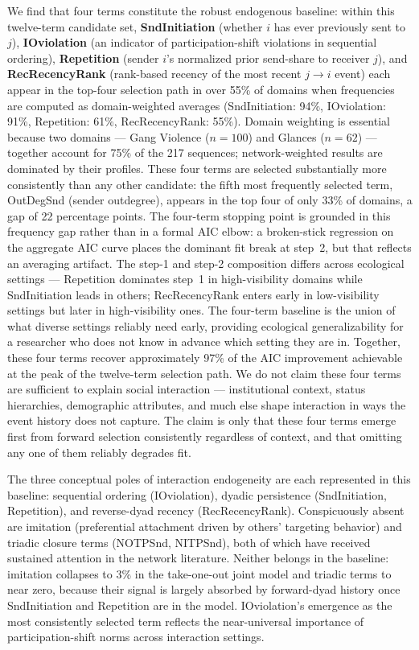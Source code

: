 \documentclass[11pt]{article}
\begin{document}
We find that four terms constitute the robust endogenous baseline: within
this twelve-term candidate set,
\textbf{SndInitiation} (whether $i$ has ever
previously sent to $j$), \textbf{IOviolation} (an indicator of participation-shift violations
in sequential ordering), \textbf{Repetition} (sender $i$'s
normalized prior send-share to receiver $j$), and \textbf{RecRecencyRank} (rank-based recency of
the most recent $j \to i$ event) each appear in the top-four
selection path in over 55\% of domains when frequencies are computed as
domain-weighted averages (SndInitiation: 94\%, IOviolation: 91\%,
Repetition: 61\%, RecRecencyRank: 55\%). Domain weighting is essential
because two domains --- Gang Violence ($n=100$) and Glances ($n=62$) ---
together account for 75\% of the 217 sequences; network-weighted results
are dominated by their profiles. These four terms are selected substantially
more consistently than any other candidate: the fifth most frequently selected
term, OutDegSnd (sender outdegree), appears in the top four of only 33\% of
domains, a gap of 22 percentage points. The four-term stopping point is
grounded in this frequency gap rather than in a formal AIC elbow: a
broken-stick regression on the aggregate AIC curve places the dominant
fit break at step~2, but that reflects an averaging artifact. The step-1
and step-2 composition differs across ecological settings --- Repetition
dominates step~1 in high-visibility domains while SndInitiation leads in
others; RecRecencyRank enters early in low-visibility settings but later
in high-visibility ones. The four-term baseline is the union of what
diverse settings reliably need early, providing ecological generalizability for
a researcher who does not know in advance which setting they are in.
Together, these four terms recover approximately 97\% of the AIC
improvement achievable at the peak of the twelve-term selection path. We do not claim these four terms are sufficient
to explain social interaction --- institutional context, status hierarchies,
demographic attributes, and much else shape interaction in ways the event
history does not capture. The claim is only that these four terms emerge
first from forward selection consistently regardless of context, and that
omitting any one of them reliably degrades fit.

The three conceptual poles of interaction endogeneity are each represented
in this baseline: sequential ordering (IOviolation), dyadic persistence
(SndInitiation, Repetition), and reverse-dyad recency (RecRecencyRank).
Conspicuously absent are imitation (preferential attachment driven by
others' targeting behavior) and triadic closure terms (NOTPSnd, NITPSnd),
both of which have received sustained attention in the network literature.
Neither belongs in the baseline: imitation collapses to 3\% in the
take-one-out joint model and triadic terms to near zero, because their
signal is largely absorbed by forward-dyad history once SndInitiation and
Repetition are in the model. IOviolation's emergence as the most consistently selected term reflects the
near-universal importance of participation-shift norms across interaction
settings.
\end{document}

